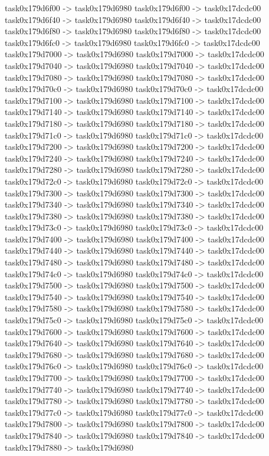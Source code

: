 {	task0x179d6f00 -> task0x179d6980
	task0x179d6f00 -> task0x17dcdc00
	task0x179d6f40 -> task0x179d6980
	task0x179d6f40 -> task0x17dcdc00
	task0x179d6f80 -> task0x179d6980
	task0x179d6f80 -> task0x17dcdc00
	task0x179d6fc0 -> task0x179d6980
	task0x179d6fc0 -> task0x17dcdc00
	task0x179d7000 -> task0x179d6980
	task0x179d7000 -> task0x17dcdc00
	task0x179d7040 -> task0x179d6980
	task0x179d7040 -> task0x17dcdc00
	task0x179d7080 -> task0x179d6980
	task0x179d7080 -> task0x17dcdc00
	task0x179d70c0 -> task0x179d6980
	task0x179d70c0 -> task0x17dcdc00
	task0x179d7100 -> task0x179d6980
	task0x179d7100 -> task0x17dcdc00
	task0x179d7140 -> task0x179d6980
	task0x179d7140 -> task0x17dcdc00
	task0x179d7180 -> task0x179d6980
	task0x179d7180 -> task0x17dcdc00
	task0x179d71c0 -> task0x179d6980
	task0x179d71c0 -> task0x17dcdc00
	task0x179d7200 -> task0x179d6980
	task0x179d7200 -> task0x17dcdc00
	task0x179d7240 -> task0x179d6980
	task0x179d7240 -> task0x17dcdc00
	task0x179d7280 -> task0x179d6980
	task0x179d7280 -> task0x17dcdc00
	task0x179d72c0 -> task0x179d6980
	task0x179d72c0 -> task0x17dcdc00
	task0x179d7300 -> task0x179d6980
	task0x179d7300 -> task0x17dcdc00
	task0x179d7340 -> task0x179d6980
	task0x179d7340 -> task0x17dcdc00
	task0x179d7380 -> task0x179d6980
	task0x179d7380 -> task0x17dcdc00
	task0x179d73c0 -> task0x179d6980
	task0x179d73c0 -> task0x17dcdc00
	task0x179d7400 -> task0x179d6980
	task0x179d7400 -> task0x17dcdc00
	task0x179d7440 -> task0x179d6980
	task0x179d7440 -> task0x17dcdc00
	task0x179d7480 -> task0x179d6980
	task0x179d7480 -> task0x17dcdc00
	task0x179d74c0 -> task0x179d6980
	task0x179d74c0 -> task0x17dcdc00
	task0x179d7500 -> task0x179d6980
	task0x179d7500 -> task0x17dcdc00
	task0x179d7540 -> task0x179d6980
	task0x179d7540 -> task0x17dcdc00
	task0x179d7580 -> task0x179d6980
	task0x179d7580 -> task0x17dcdc00
	task0x179d75c0 -> task0x179d6980
	task0x179d75c0 -> task0x17dcdc00
	task0x179d7600 -> task0x179d6980
	task0x179d7600 -> task0x17dcdc00
	task0x179d7640 -> task0x179d6980
	task0x179d7640 -> task0x17dcdc00
	task0x179d7680 -> task0x179d6980
	task0x179d7680 -> task0x17dcdc00
	task0x179d76c0 -> task0x179d6980
	task0x179d76c0 -> task0x17dcdc00
	task0x179d7700 -> task0x179d6980
	task0x179d7700 -> task0x17dcdc00
	task0x179d7740 -> task0x179d6980
	task0x179d7740 -> task0x17dcdc00
	task0x179d7780 -> task0x179d6980
	task0x179d7780 -> task0x17dcdc00
	task0x179d77c0 -> task0x179d6980
	task0x179d77c0 -> task0x17dcdc00
	task0x179d7800 -> task0x179d6980
	task0x179d7800 -> task0x17dcdc00
	task0x179d7840 -> task0x179d6980
	task0x179d7840 -> task0x17dcdc00
	task0x179d7880 -> task0x179d6980
}
